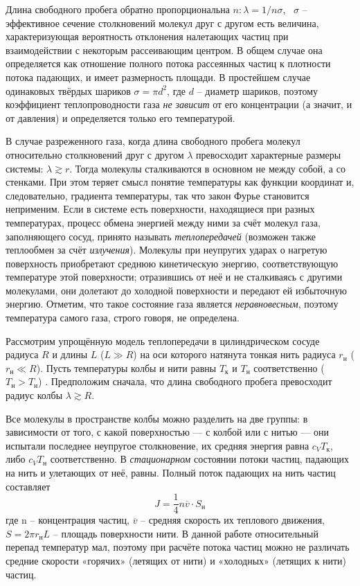 \documentclass[a4paper,12pt]{article}
\begin{document}
Длина свободного пробега обратно пропорциональна $ n : \lambda = 1 / n\sigma,\text{ } \sigma$ -- эффективное сечение столкновений молекул друг с другом есть величина, характеризующая вероятность отклонения налетающих частиц при взаимодействии с некоторым рассеивающим центром. В общем случае она определяется как отношение полного потока рассеянных частиц к плотности потока падающих, и имеет размерность площади. В простейшем случае одинаковых твёрдых шариков $\sigma = \pi d^2 $, где $d$ -- диаметр шариков, поэтому коэффициент теплопроводности газа \textit{не зависит} от его концентрации (а значит, и от давления) и определяется только его температурой.

В случае разреженного газа, когда  длина свободного пробега молекул относительно столкновений друг с другом $\lambda$ превосходит характерные размеры системы: $\lambda \gtrsim r$. Тогда молекулы сталкиваются в
основном не между собой, а со стенками. При этом теряет смысл понятие
температуры как функции координат и, следовательно, градиента температуры, так что закон Фурье становится неприменим. Если в системе есть
поверхности, находящиеся при разных температурах, процесс обмена энергией между ними за счёт молекул газа, заполняющего сосуд, принято называть \textit{теплопередачей} (возможен также теплообмен за счёт \textit{излучения}). Молекулы при неупругих ударах о нагретую поверхность приобретают среднюю кинетическую энергию, соответствующую температуре этой поверхности; отразившись от неё и не сталкиваясь с другими молекулами, они долетают до холодной поверхности и передают ей избыточную энергию. Отметим, что такое состояние газа является \textit{неравновесным}, поэтому температура самого газа, строго говоря, не определена.

Рассмотрим упрощённую модель теплопередачи в цилиндрическом сосуде радиуса $R$ и длины $L$ ($L \gg R$) 
на оси которого натянута тонкая нить радиуса $r_н$ ($r_н \ll R$). Пусть температуры колбы и нити равны $T_к$ и $T_н$ соответственно ($T_н > T_н$) . Предположим сначала, что длина свободного пробега превосходит радиус колбы $\lambda \gtrsim R$.

Все молекулы в пространстве колбы можно разделить на две группы: в зависимости от того, с какой поверхностью — с колбой или с нитью — они испытали последнее
неупругое столкновение, их средняя энергия равна $c_V T_к$, либо $c_V T_н$ соответственно. В \textit{стационарном} состоянии потоки частиц, падающих на нить и улетающих от неё, равны. Полный поток падающих на нить частиц составляет
\[J = \frac{1}{4} n \overline{v}\cdot S_{н}\]
где n -- концентрация частиц, $\overline{v}$ -- средняя скорость их теплового движения, $S = 2\pi r_н L$ -- площадь поверхности нити. В данной работе относительный перепад температур мал, поэтому при расчёте потока частиц можно не различать средние скорости «горячих» (летящих от нити) и «холодных» (летящих к нити) частиц.
\end{document}
